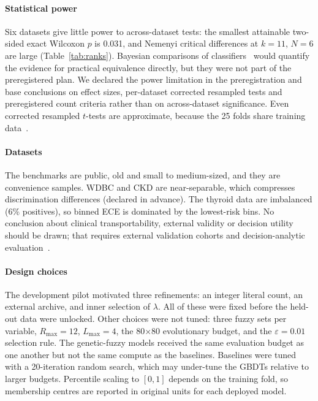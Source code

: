 \paragraph{Statistical power}
Six datasets give little power to across-dataset tests: the smallest attainable
two-sided exact Wilcoxon $p$ is 0.031, and Nemenyi critical differences at $k=11$, $N=6$
are large (Table~\ref{tab:ranks}). Bayesian comparisons of classifiers~\cite{benavoli2017}
would quantify the evidence for practical equivalence directly, but they were not part
of the preregistered plan. We declared the power limitation in the preregistration and base
conclusions on effect sizes, per-dataset corrected resampled tests and preregistered
count criteria rather than on across-dataset significance. Even corrected
resampled $t$-tests are approximate, because the 25 folds share training
data~\cite{nadeau2003}.

\paragraph{Datasets}
The benchmarks are public, old and small to medium-sized, and they are convenience
samples. WDBC and
CKD are near-separable, which compresses discrimination differences (declared in
advance). The thyroid data are imbalanced (6\% positives), so binned ECE is dominated
by the lowest-risk bins. No conclusion about clinical transportability, external
validity or decision utility should be drawn; that requires external validation
cohorts and decision-analytic evaluation~\cite{steyerberg2010,collins2015}.

\paragraph{Design choices}
The development pilot motivated three refinements: an integer literal count, an
external archive, and inner selection of $\lambda$. All of these were fixed before
the held-out data were unlocked. Other choices were not tuned: three fuzzy sets per
variable, $R_{\max}=12$, $L_{\max}=4$, the 80$\times$80 evolutionary budget, and the
$\varepsilon=0.01$ selection rule. The genetic-fuzzy models received the same
evaluation budget as one another but not the same compute as the baselines.
Baselines were tuned with a 20-iteration random search, which may under-tune the
GBDTs relative to larger budgets. Percentile scaling to $[0,1]$ depends on the training
fold, so membership centres are reported in original units for each deployed model.

